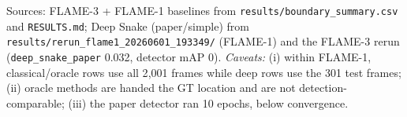 \documentclass[10pt]{article}
\begin{document}
\vspace{0.5em}
\footnotesize
Sources: FLAME-3 + FLAME-1 baselines from \texttt{results/boundary\_summary.csv} and
\texttt{RESULTS.md}; Deep Snake (paper/simple) from
\texttt{results/rerun\_flame1\_20260601\_193349/} (FLAME-1) and the FLAME-3 rerun
(\texttt{deep\_snake\_paper} 0.032, detector mAP 0). \emph{Caveats:} (i) within
FLAME-1, classical/oracle rows use all 2{,}001 frames while deep rows use the 301
test frames; (ii) oracle methods are handed the GT location and are not
detection-comparable; (iii) the paper detector ran 10 epochs, below convergence.
\end{document}
